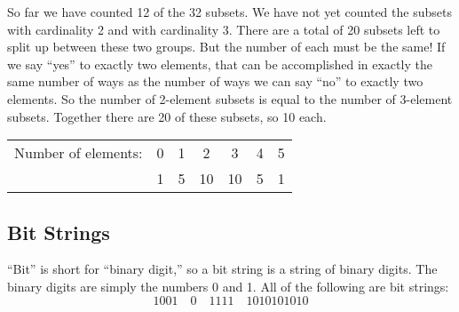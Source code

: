 \documentclass[10pt,]{book}
\theoremstyle{plain}
\theoremstyle{definition}
\theoremstyle{definition}
\theoremstyle{definition}
\numberwithin{equation}{chapter}
\newcommand{\hrulethin}  {\noalign{\hrule height 0.04em}}
\begin{document}
        So far we have counted 12 of the 32 subsets. We have not yet counted the subsets with cardinality 2 and with cardinality 3. There are a total of 20 subsets left to split up between these two groups. But the number of each must be the same! If we say ``yes'' to exactly two elements, that can be accomplished in exactly the same number of ways as the number of ways we can say ``no'' to exactly two elements. So the number of 2-element subsets is equal to the number of 3-element subsets. Together there are 20 of these subsets, so 10 each.
\leavevmode%
\begin{table}
\centering
\begin{tabular}{lllllll}
\multicolumn{1}{c}{Number of elements:}&\multicolumn{1}{c}{0}&\multicolumn{1}{c}{1}&\multicolumn{1}{c}{2}&\multicolumn{1}{c}{3}&\multicolumn{1}{c}{4}&\multicolumn{1}{c}{5}\tabularnewline\hrulethin
\multicolumn{1}{c}{Number of subsets:}&\multicolumn{1}{c}{1}&\multicolumn{1}{c}{5}&\multicolumn{1}{c}{10}&\multicolumn{1}{c}{10}&\multicolumn{1}{c}{5}&\multicolumn{1}{c}{1}
\end{tabular}
\end{table}
\typeout{************************************************}
\typeout{************************************************}
\subsection[
        Bit Strings
      ]{
        Bit Strings
      }\label{subsection-13}
 ``Bit'' is short for ``binary digit,'' so a bit string is a string of binary digits. The binary digits are simply the numbers 0 and 1. All of the following are bit strings:
      \begin{equation*}
        1001 \quad 0 \quad 1111 \quad 1010101010
      \end{equation*}
\par
\end{document}

